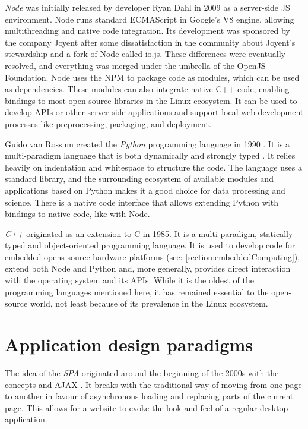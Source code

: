 \emph{Node} was initially released by developer Ryan Dahl in 2009 as a server-side \ac{JS} environment. Node runs standard ECMAScript in Google's V8 engine, allowing multithreading and native code integration. Its development was sponsored by the company Joyent after some dissatisfaction in the community about Joyent's stewardship and a fork of Node called io.js. These differences were eventually resolved, and everything was merged under the umbrella of the OpenJS Foundation. Node uses the \ac{NPM} to package code as modules, which can be used as dependencies. These modules can also integrate native C++ code, enabling bindings to most open-source libraries in the Linux ecosystem. It can be used to develop \ac{API}s or other server-side applications and support local web development processes like preprocessing, packaging, and deployment.

Guido van Rossum created the \emph{Python} programming language in 1990 \parencite{pythonHistory}. It is a multi-paradigm language that is both dynamically and strongly typed \parencite{pythonTyping}. It relies heavily on indentation and whitespace to structure the code. The language uses a standard library, and the surrounding ecosystem of available modules and applications based on Python makes it a good choice for data processing and science. There is a native code interface that allows extending Python with bindings to native code, like with Node.

\emph{C++} originated as an extension to C in 1985. It is a multi-paradigm, statically typed and object-oriented programming language. It is used to develop code for embedded opens-source hardware platforms (see: \autoref{section:embeddedComputing}), extend both Node and Python and, more generally, provides direct interaction with the operating system and its APIs. While it is the oldest of the programming languages mentioned here, it has remained essential to the open-source world, not least because of its prevalence in the Linux ecosystem.


\section{Application design paradigms}

The idea of the \emph{\ac{SPA}} originated around the beginning of the 2000s with the concepts  \parencite{innerBrowsing} and \ac{AJAX} \parencite{ajaxNewApproach}. It breaks with the traditional way of moving from one page to another in favour of asynchronous loading and replacing parts of the current page. This allows for a website to evoke the look and feel of a regular desktop application.

